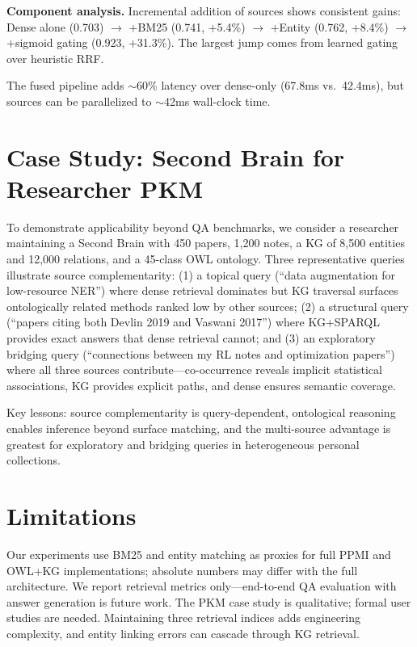 \documentclass[preprint,12pt]{elsarticle}
\begin{document}
\textbf{Component analysis.} Incremental addition of sources shows consistent gains: Dense alone (0.703) $\rightarrow$ +BM25 (0.741, +5.4\%) $\rightarrow$ +Entity (0.762, +8.4\%) $\rightarrow$ +sigmoid gating (0.923, +31.3\%). The largest jump comes from learned gating over heuristic RRF.

The fused pipeline adds $\sim$60\% latency over dense-only (67.8ms vs.\ 42.4ms), but sources can be parallelized to $\sim$42ms wall-clock time.

\section{Case Study: Second Brain for Researcher PKM}
\label{sec:case_study}

To demonstrate applicability beyond QA benchmarks, we consider a researcher maintaining a Second Brain with 450 papers, 1,200 notes, a KG of 8,500 entities and 12,000 relations, and a 45-class OWL ontology. Three representative queries illustrate source complementarity: (1) a topical query (``data augmentation for low-resource NER'') where dense retrieval dominates but KG traversal surfaces ontologically related methods ranked low by other sources; (2) a structural query (``papers citing both Devlin 2019 and Vaswani 2017'') where KG+SPARQL provides exact answers that dense retrieval cannot; and (3) an exploratory bridging query (``connections between my RL notes and optimization papers'') where all three sources contribute---co-occurrence reveals implicit statistical associations, KG provides explicit paths, and dense ensures semantic coverage.

Key lessons: source complementarity is query-dependent, ontological reasoning enables inference beyond surface matching, and the multi-source advantage is greatest for exploratory and bridging queries in heterogeneous personal collections.

\section{Limitations}
\label{sec:limitations}

Our experiments use BM25 and entity matching as proxies for full PPMI and OWL+KG implementations; absolute numbers may differ with the full architecture. We report retrieval metrics only---end-to-end QA evaluation with answer generation is future work. The PKM case study is qualitative; formal user studies are needed. Maintaining three retrieval indices adds engineering complexity, and entity linking errors can cascade through KG retrieval.
\end{document}
